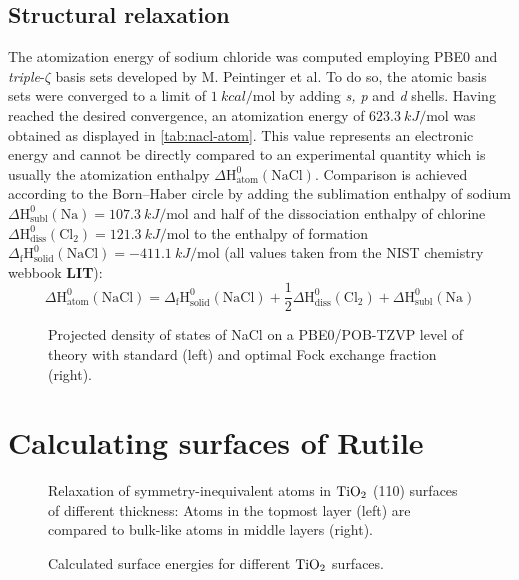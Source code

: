 \documentclass[a4paper,12pt]{scrartcl}
\begin{document}
\subsection{Structural relaxation}
%
The atomization energy of sodium chloride was computed employing PBE0 and \textit{triple}-$\zeta$ basis sets developed by M. Peintinger et al. To do so, the atomic basis sets were converged to a limit of $ \SI{1}{kcal \per \mole} $ by adding \textit{s, p} and \textit{d} shells. Having reached the desired convergence, an atomization energy of $ \SI{623.3}{kJ \per \mole} $ was obtained as displayed in \autoref{tab:nacl-atom}. This value represents an electronic energy and cannot be directly compared to an experimental quantity which is usually the atomization enthalpy $ \Delta \mathrm{H^{0}_{atom}(NaCl)} $. Comparison is achieved according to the Born--Haber circle by adding the sublimation enthalpy of sodium $ \Delta \mathrm{H^{0}_{subl}(Na)} = \SI{107.3}{kJ \per \mole} $ and half of the dissociation enthalpy of chlorine $ \Delta \mathrm{H^{0}_{diss}(Cl_2)} = \SI{121.3}{kJ \per \mole}  $ to the enthalpy of formation $ \Delta \mathrm{_f H^{0}_{solid}(NaCl)} = \SI{-411.1}{kJ \per \mole}$ (all values taken from the NIST chemistry webbook \textbf{LIT}):
%
\begin{equation}
	\Delta \mathrm{H^{0}_{atom}(NaCl)} = \Delta \mathrm{_f H^{0}_{solid}(NaCl)} + \frac{1}{2}\Delta \mathrm{H^{0}_{diss}(Cl_2)} + \Delta \mathrm{H^{0}_{subl}(Na)}
\end{equation}
%
\begin{figure}
	\centering
	
	\vspace{-20pt}
	\caption{Projected density of states of NaCl on a PBE0/POB-TZVP level of theory with standard (left) and optimal Fock exchange fraction (right).}
	\label{fig:pdos}
\end{figure}

\section{Calculating surfaces of Rutile}
%
\begin{figure}
	\centering
	
	\vspace{-20pt}
	\caption{Relaxation of symmetry-inequivalent atoms in $ \ce{TiO2} $ (110) surfaces of different thickness: Atoms in the topmost layer (left) are compared to bulk-like atoms in middle layers (right).}
	\label{fig:dz}
\end{figure}
%
\begin{figure}
	\centering
	
	\vspace{-20pt}
	\caption{Calculated surface energies for different $ \ce{TiO2} $ surfaces.}
	\label{fig:slab}
\end{figure}
%
\newpage
\printbibliography[title={Literature}]
%
\end{document}
